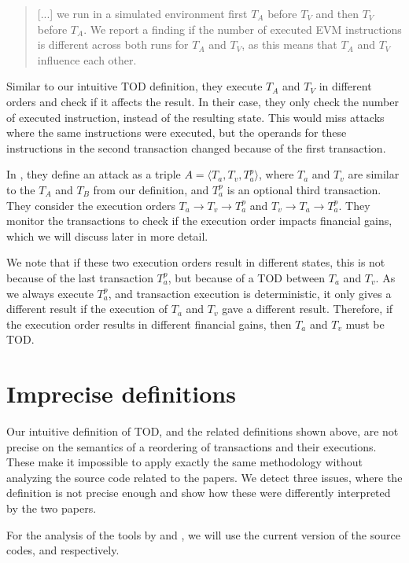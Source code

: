 \documentclass[draft,final]{vutinfth} %
\begin{document}
\begin{quote}
    [...] we run in a simulated environment first $T_A$ before $T_V$ and then $T_V$ before $T_A$. We report a finding if the number of executed EVM instructions is different across both runs for $T_A$ and $T_V$, as this means that $T_A$ and $T_V$ influence each other.
\end{quote}

Similar to our intuitive TOD definition, they execute $T_A$ and $T_V$ in different orders and check if it affects the result. In their case, they only check the number of executed instruction, instead of the resulting state. This would miss attacks where the same instructions were executed, but the operands for these instructions in the second transaction changed because of the first transaction.

In \cite{zhang_combatting_2023}, they define an attack as a triple $A = \langle T_a, T_v, T_a^p\rangle$, where $T_a$ and $T_v$ are similar to the $T_A$ and $T_B$ from our definition, and $T_a^p$ is an optional third transaction. They consider the execution orders $T_a \rightarrow T_v \rightarrow T_a^p$ and $T_v \rightarrow T_a \rightarrow T_a^p$. They monitor the transactions to check if the execution order impacts financial gains, which we will discuss later in more detail.

We note that if these two execution orders result in different states, this is not because of the last transaction $T_a^p$, but because of a TOD between $T_a$ and $T_v$. As we always execute $T_a^p$, and transaction execution is deterministic, it only gives a different result if the execution of $T_a$ and $T_v$ gave a different result. Therefore, if the execution order results in different financial gains, then $T_a$ and $T_v$ must be TOD.

\section{Imprecise definitions}

Our intuitive definition of TOD, and the related definitions shown above, are not precise on the semantics of a reordering of transactions and their executions. These make it impossible to apply exactly the same methodology without analyzing the source code related to the papers. We detect three issues, where the definition is not precise enough and show how these were differently interpreted by the two papers.

For the analysis of the tools by \cite{zhang_combatting_2023} and \cite{torres_frontrunner_2021}, we will use the current version of the source codes, \cite{zhang_erebus-redgiant_2023} and \cite{torres_frontrunner_2022} respectively.
\end{document}
